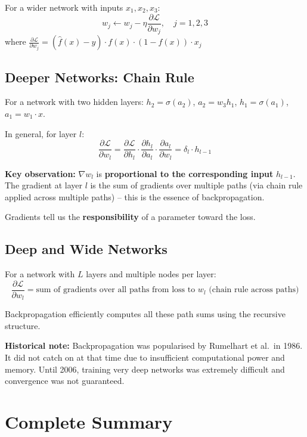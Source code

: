 \documentclass[12pt,a4paper]{article}
\newcommand{\Loss}{\mathcal{L}}
\begin{document}
For a wider network with inputs $x_1, x_2, x_3$:
\[
w_j \leftarrow w_j - \eta\frac{\partial\Loss}{\partial w_j},
\quad j = 1, 2, 3
\]
where $\frac{\partial\Loss}{\partial w_j} = (\hat{f}(x)-y)\cdot f(x)\cdot(1-f(x))\cdot x_j$

\subsection{Deeper Networks: Chain Rule}

For a network with two hidden layers: $h_2 = \sigma(a_2)$, $a_2 = w_3 h_1$, $h_1 = \sigma(a_1)$, $a_1 = w_1 \cdot x$.

In general, for layer $l$:
\[
\frac{\partial\Loss}{\partial w_l}
= \frac{\partial\Loss}{\partial h_l}
  \cdot \frac{\partial h_l}{\partial a_l}
  \cdot \frac{\partial a_l}{\partial w_l}
= \delta_l \cdot h_{l-1}
\]

\begin{keybox}
\textbf{Key observation:} $\nabla w_l$ is \textbf{proportional to the corresponding input} $h_{l-1}$. The gradient at layer $l$ is the sum of gradients over multiple paths (via chain rule applied across multiple paths) -- this is the essence of backpropagation.

Gradients tell us the \textbf{responsibility} of a parameter toward the loss.
\end{keybox}

\subsection{Deep and Wide Networks}

For a network with $L$ layers and multiple nodes per layer:
\[
\frac{\partial\Loss}{\partial w_l}
= \text{sum of gradients over all paths from loss to } w_l \text{ (chain rule across paths)}
\]

Backpropagation efficiently computes all these path sums using the recursive structure.

\textbf{Historical note:} Backpropagation was popularised by Rumelhart et al.\ in 1986. It did not catch on at that time due to insufficient computational power and memory. Until 2006, training very deep networks was extremely difficult and convergence was not guaranteed.

\section{Complete Summary}
\end{document}

